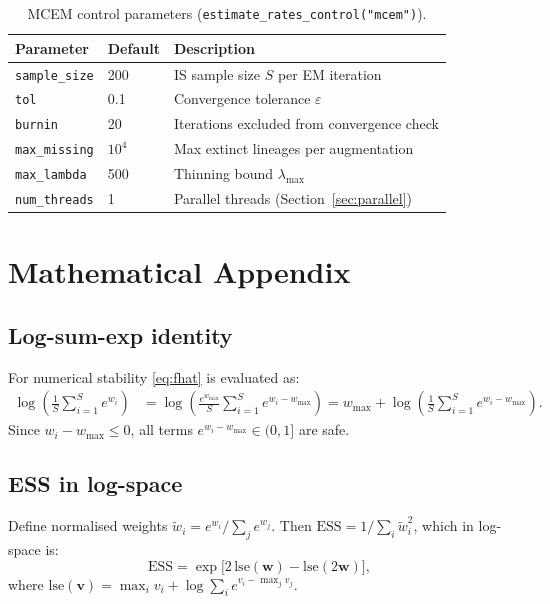 \documentclass[12pt,a4paper]{article}
\newcommand{\lw}{w}
\newcommand{\ESS}{\mathrm{ESS}}
\begin{document}
\begin{table}[ht]
\centering
\caption{MCEM control parameters (\texttt{estimate\_rates\_control("mcem")}).}
\label{tab:mcemcontrol}
\renewcommand{\arraystretch}{1.2}
\begin{tabular}{llp{7.8cm}}
\toprule
Parameter & Default & Description \\
\midrule
\texttt{sample\_size} & 200 & IS sample size $S$ per EM iteration \\
\texttt{tol} & 0.1 & Convergence tolerance $\varepsilon$ \\
\texttt{burnin} & 20 & Iterations excluded from convergence check \\
\texttt{max\_missing} & $10^4$ & Max extinct lineages per augmentation \\
\texttt{max\_lambda} & 500 & Thinning bound $\lambda_{\max}$ \\
\texttt{num\_threads} & 1 & Parallel threads (Section~\ref{sec:parallel}) \\
\bottomrule
\end{tabular}
\end{table}

\section{Mathematical Appendix}\label{sec:appendix}

\subsection{Log-sum-exp identity}

For numerical stability \eqref{eq:fhat} is evaluated as:
\begin{align}
  \log\!\left(\frac{1}{S}\sum_{i=1}^S e^{\lw_i}\right)
  &= \log\!\left(\frac{e^{w_{\max}}}{S}
      \sum_{i=1}^S e^{\lw_i - w_{\max}}\right)
   = w_{\max} + \log\!\left(\frac{1}{S}\sum_{i=1}^S
     e^{\lw_i - w_{\max}}\right).
\end{align}
Since $\lw_i - w_{\max} \leq 0$, all terms $e^{\lw_i-w_{\max}} \in (0,1]$
are safe.

\subsection{ESS in log-space}

Define normalised weights $\tilde{w}_i = e^{\lw_i}/\sum_j e^{\lw_j}$.
Then $\ESS = 1/\sum_i \tilde{w}_i^2$, which in log-space is:
\begin{equation}
  \ESS = \exp\!\bigl[2\,\mathrm{lse}(\mathbf{w})
                   - \mathrm{lse}(2\mathbf{w})\bigr],
\end{equation}
where $\mathrm{lse}(\mathbf{v}) = \max_i v_i
+ \log\sum_i e^{v_i - \max_j v_j}$.
\end{document}
